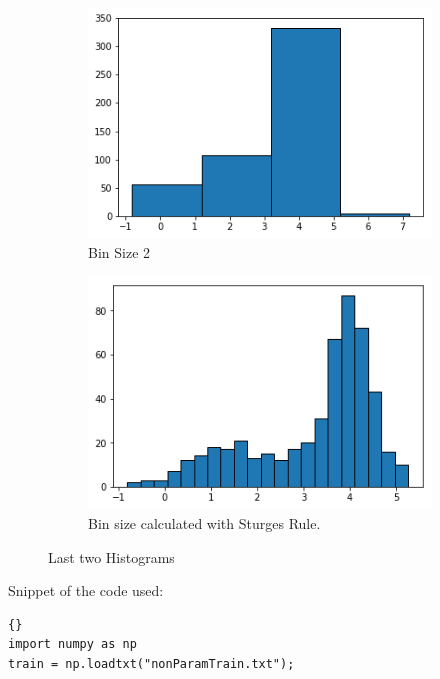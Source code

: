 \begin{questions}
\begin{figure}[H]
	\centering
	\begin{subfigure}[b]{0.4\linewidth}
		\includegraphics[width=\linewidth]{pictures/histogram2.png}
		\caption{Bin Size 2}
		\label{fig:histogram3}
	\end{subfigure}
	\begin{subfigure}[b]{0.4\linewidth}
		\includegraphics[width=\linewidth]{pictures/histogramSturge.png}
		\caption{Bin size calculated with Sturges Rule.}
		\label{fig:histogram4}
	\end{subfigure}
	\caption{Last two Histograms}
	
\end{figure}

	
Snippet of the code used: 
\begin{lstlisting}{}
import numpy as np
train = np.loadtxt("nonParamTrain.txt");


\end{lstlisting}
\end{questions}

